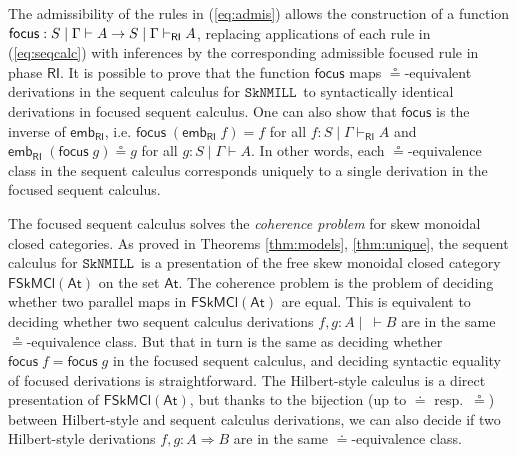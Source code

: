 \documentclass[copyright,creativecommons]{eptcs}
\theoremstyle{definition}
\newcommand{\RI}{\mathsf{RI}}
\newcommand{\SkNMILL}{$\mathtt{SkNMILL}$}
\newcommand{\FSkMCC}{\mathsf{FSkMCl}}
\begin{document}
The admissibility of the rules in (\ref{eq:admis}) allows the construction of a function $\mathsf{focus} : S \mid \Gamma \vdash A \to \linebreak S \mid \Gamma \vdash_\RI A$, replacing applications of each rule in (\ref{eq:seqcalc}) with inferences by the corresponding admissible focused rule in phase $\RI$.
It is possible to prove that the function $\mathsf{focus}$ maps  $\circeq$-equivalent derivations in the sequent calculus for \SkNMILL\ to syntactically identical derivations in focused sequent calculus. One can also show that $\mathsf{focus}$ is the inverse of $\mathsf{emb}_\RI$, i.e. $\mathsf{focus}\;(\mathsf{emb}_\RI \;f) = f$ for all $f : S \mid \Gamma \vdash_\RI A$ and $\mathsf{emb}_\RI\;(\mathsf{focus}\;g) \circeq g$ for all $g : S \mid \Gamma \vdash A$. In other words, each $\circeq$-equivalence class in the sequent calculus corresponds uniquely to a single derivation in the focused sequent calculus.

The focused sequent calculus solves the \emph{coherence problem} for skew monoidal closed categories.
As proved in Theorems \ref{thm:models}, \ref{thm:unique}, the sequent calculus for \SkNMILL\ is a presentation of the free skew monoidal closed category $\FSkMCC(\mathsf{At})$ on the set $\mathsf{At}$. The coherence problem is the problem of deciding whether two parallel maps in $\FSkMCC(\mathsf{At})$ are equal.
This is equivalent to deciding whether two sequent calculus derivations $f,g : A \mid ~ \vdash B$ are in the same $\circeq$-equivalence class. But that in turn is the same as deciding whether $\mathsf{focus}\;f = \mathsf{focus}\;g$ in the focused sequent calculus, and deciding syntactic equality of focused derivations is straightforward. The Hilbert-style calculus is a direct presentation of $\FSkMCC(\mathsf{At})$, but thanks to the bijection (up to $\doteq$ resp.\ $\circeq$) between Hilbert-style and sequent calculus derivations, we can also decide if two Hilbert-style derivations $f, g : A \Rightarrow B$ are in the same $\doteq$-equivalence class.
\end{document}
